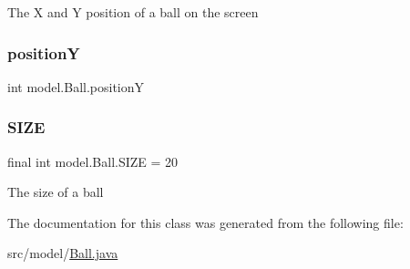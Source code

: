 The X and Y position of a ball on the screen \hypertarget{classmodel_1_1_ball_aac5d95f10dd849f8cea43c34300d9649}{}\label{classmodel_1_1_ball_aac5d95f10dd849f8cea43c34300d9649} 
\subsubsection{\texorpdfstring{positionY}{positionY}}
{\footnotesize\ttfamily int model.\+Ball.\+positionY\hspace{0.3cm}{\ttfamily [private]}}

\hypertarget{classmodel_1_1_ball_ad9a73bce4f016c2bd11fb037bac835c7}{}\label{classmodel_1_1_ball_ad9a73bce4f016c2bd11fb037bac835c7} 
\subsubsection{\texorpdfstring{S\+I\+ZE}{SIZE}}
{\footnotesize\ttfamily final int model.\+Ball.\+S\+I\+ZE = 20\hspace{0.3cm}{\ttfamily [private]}}

The size of a ball 

The documentation for this class was generated from the following file\+:\begin{DoxyCompactItemize}
\item 
src/model/\hyperlink{_ball_8java}{Ball.\+java}\end{DoxyCompactItemize}
